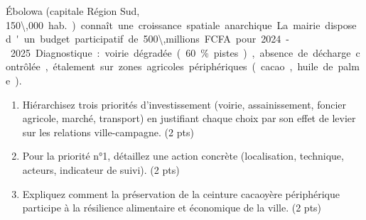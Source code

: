 \documentclass[11pt]{article}
\begin{document}
\begin{exercice}
\label{exo:ebolowa}
Ébolowa (capitale Région Sud, \SI{150\,000}{hab.}) connaît une croissance spatiale anarchique. La mairie dispose d'un budget participatif de \SI{500\,millions}{FCFA} pour 2024-2025. Diagnostique : voirie dégradée (60\% pistes), absence de décharge contrôlée, étalement sur zones agricoles périphériques (cacao, huile de palme).
\begin{enumerate}
    \item Hiérarchisez trois priorités d'investissement (voirie, assainissement, foncier agricole, marché, transport) en justifiant chaque choix par son effet de levier sur les relations ville-campagne. \hfill (2 pts)
    \item Pour la priorité n°1, détaillez une action concrète (localisation, technique, acteurs, indicateur de suivi). \hfill (2 pts)
    \item Expliquez comment la préservation de la ceinture cacaoyère périphérique participe à la résilience alimentaire et économique de la ville. \hfill (2 pts)
\end{enumerate}
\end{exercice}
\end{document}
